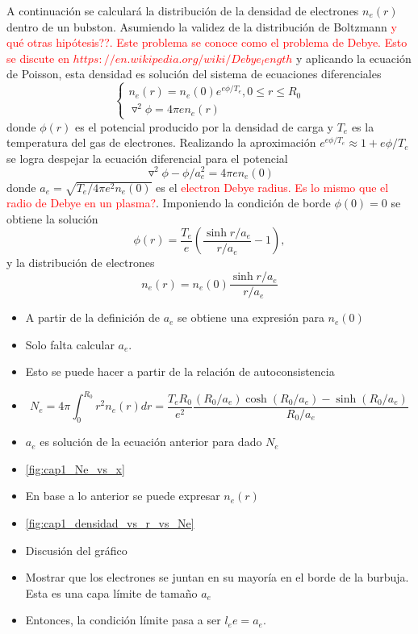 \documentclass[aps,prb,onecolumn,superscriptaddress,floatfix,longbibliography,10pt]{revtex4-2}
\newif\ifptitle
\newif\ifpnumber
\newcounter{para}
\newcommand\ptitle[1]{\par\refstepcounter{para}
{\ifpnumber{\noindent\textcolor{lightgray}{\textbf{\thepara}}\indent}\fi}
{\ifptitle{\textbf{[{#1}]}}\fi}}
\begin{document}
A continuación se calculará la distribución de la densidad de electrones $n_e(r)$ dentro de un bubston. Asumiendo la validez de la distribución de Boltzmann \textcolor{red}{y qué otras hipótesis??. Este problema se conoce como el problema de Debye. Esto se discute en $https://en.wikipedia.org/wiki/Debye_length$} y aplicando la ecuación de Poisson, esta densidad es solución del sistema de ecuaciones diferenciales
\[
\left\{\begin{matrix}
  n_e(r) = n_e(0)e^{e \phi / T_e}, 0 \leq r \leq R_0 \\
  \triangledown^2 \phi = 4 \pi e n_e(r)
\end{matrix}\right.
\]
donde $\phi(r)$ es el potencial producido por la densidad de carga y $T_e$ es la temperatura del gas de electrones. Realizando la aproximación $e^{e \phi / T_e} \approx 1 + e \phi/T_e$
se logra despejar la ecuación diferencial para el potencial
\[\triangledown^2 \phi - \phi/a_e^2 = 4 \pi e n_e(0) \]
donde $a_e = \sqrt{T_e/4\pi e^2 n_e(0)}$ es el \textcolor{red}{electron Debye radius. Es lo mismo que el radio de Debye en un plasma?}. Imponiendo la condición de borde $\phi(0) = 0$ se obtiene la solución
\begin{equation}
  \phi(r) = \frac{T_e}{e} \left ( \frac{\sinh{r/a_e}}{r/a_e} - 1   \right ),
  \label{eq:cap1_phi}
\end{equation}
y la distribución de electrones
\begin{equation}
  n_e(r) = n_e(0) \frac{\sinh{r/a_e}}{r/a_e}
  \label{eq:cap1_ne}
\end{equation}


\ptitle{Cálculo de las ctes de la expresión de la densidad máxima}

\begin{itemize}
  \item A partir de la definición de $a_e$ se obtiene una expresión para $n_e(0)$
  \item Solo falta calcular $a_e$.
  \item Esto se puede hacer a partir de la relación de autoconsistencia
  \item \begin{equation}
          N_e = 4 \pi \int_0^{R_0} r^2 n_e(r) dr = \frac{T_e R_0}{e^2} \frac{(R_0/a_e) \cosh{(R_0/a_e)} - \sinh{(R_0/a_e)}}{R_0/a_e}
          \label{eq:cap1_Ne}
        \end{equation}
  \item $a_e$ es solución de la ecuación anterior para dado $N_e$
  \item \ref{fig:cap1_Ne_vs_x}
  \item En base a lo anterior se puede expresar $n_e(r)$
  \item \ref{fig:cap1_densidad_vs_r_vs_Ne}
  \item Discusión del gráfico
  \item Mostrar que los electrones se juntan en su mayoría en el borde de la burbuja. Esta es una capa límite de tamaño $a_e$
  \item Entonces, la condición límite pasa a ser $l_ee = a_e$.
\end{itemize}
\end{document}
